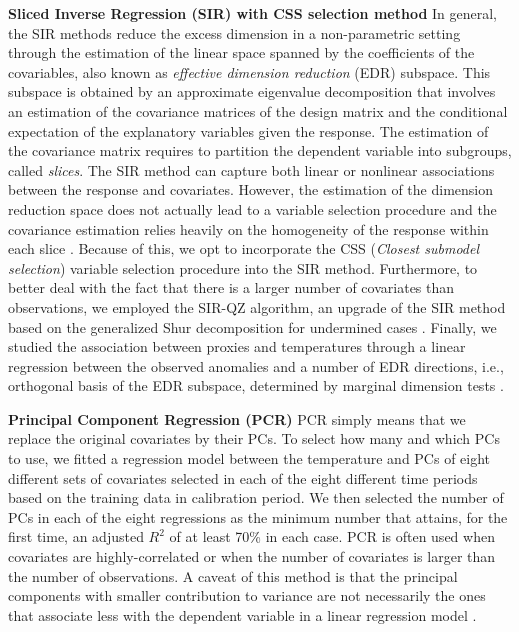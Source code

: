 \documentclass[12pt]{amsart}
\theoremstyle{plain}
\theoremstyle{definition}
\theoremstyle{remark}
\begin{document}
{\bf Sliced Inverse Regression (SIR) with CSS selection method}
  In general, the SIR methods \cite{Li1991}  reduce the excess dimension in a non-parametric setting through the
  estimation of the linear space spanned by the coefficients of the covariables,
  also known as \textit{effective dimension reduction} (EDR) subspace. 
  This subspace is obtained by an approximate eigenvalue decomposition that
  involves an estimation of the covariance matrices of the design matrix and
  the conditional expectation of the explanatory variables given the
  response. The
  estimation of the covariance matrix requires to partition the dependent variable into subgroups, called \textit{slices}.
  The SIR method can capture both linear or nonlinear associations between the response and
  covariates. However, the estimation of the dimension
  reduction space does not actually lead to a variable selection procedure and the
  covariance estimation relies heavily on the homogeneity of the response within
  each slice \cite{Wu2010}. Because of this, we opt to incorporate the CSS
  (\textit{Closest submodel selection}) variable 
  selection procedure into the SIR method. Furthermore, to better deal with the fact that there is a larger number of
  covariates than observations, we employed the SIR-QZ algorithm, an upgrade of the SIR method based on the generalized Shur decomposition for undermined cases \citep{Coudret2014,Coudret2017}.   
  Finally, we studied the association between proxies and temperatures
  through a linear regression between the observed anomalies and a number of EDR directions, i.e., orthogonal basis of the EDR subspace, determined by marginal dimension tests \citep{Cook2004}. 
  
{\bf Principal Component Regression (PCR)}
PCR simply means that we replace the original covariates by their PCs. To select how many and which PCs to use, we fitted a regression model between the temperature and PCs of eight different sets of covariates selected in each of the eight different time periods based on the training data in calibration period. We then selected the number of PCs in each of
the eight regressions as the minimum number that attains, for the first time, an adjusted
$R^2$ of at least 70\% in each case. PCR is often used when covariates are
highly-correlated or when the number of covariates is larger than the number of 
 observations. A caveat of this method is that the principal components
with smaller contribution to variance are not necessarily the ones that
associate less with the dependent variable in a linear regression model 
\citep{Jolliffe1982,Tibshirani1996}. 
\end{document}
